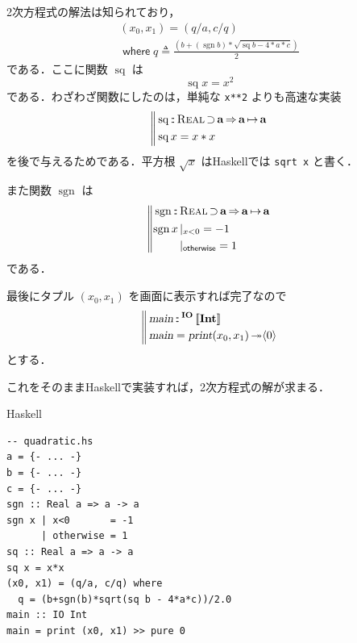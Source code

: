 \documentclass[a5paper,twoside,fleqn,draft]{jsbook}
\def\[{\left[\!\left[}
\def\]{\right]\!\right]}
\DeclareMathOperator{\sgn}{sgn}
\newcommand{\programminglanguage}[1]{\textsf{#1}}
\newcommand{\haskell}{\programminglanguage{Haskell}}
\newcommand{\code}[1]{\texttt{#1}}
\newenvironment{haskellcode}{\begin{itembox}[r]{\haskell}}{\end{itembox}}
\newcommand{\mBrace}{\Vert}
\newcommand{\mKeyword}[1]{\mathsf{#1}} %
\newcommand{\mOtherwiseKeyword}{\mKeyword{otherwise}}
\newcommand{\mWhereKeyword}{\mKeyword{where}}
\DeclareMathOperator{\mOtherwise}{\mOtherwiseKeyword}
\DeclareMathOperator{\mSuperClass}{\Rightarrow}
\DeclareMathOperator{\mSuperSet}{\supset}
\DeclareMathOperator{\mWhere}{\mWhereKeyword}
\newcommand{\mSpecialFunc}[1]{\mathrm{#1}}
\DeclareMathOperator{\mSq}{\mSpecialFunc{sq}}
\newcommand{\mAction}[1]{\textsl{#1}}
\DeclareMathOperator{\mMain}{\mAction{main}}
\DeclareMathOperator{\mPrint}{\mAction{print}}
\DeclareMathOperator{\mBindRightIgnore}{\twoheadrightarrow}
\DeclareMathOperator{\mIn}{{:\!:}}
\DeclareMathOperator{\mLetEq}{\triangleq}
\DeclareMathOperator{\mMapsTo}{\mapsto}
\newcommand{\mType}[1]{\mathbf{#1}}
\newcommand{\mIntType}{\mType{Int}}
\newcommand{\mGenericTypeAssemble}[2]{{}^{\mType{#1}}\[\mType{#2}\]}
\newcommand{\mIOType}[1]{\mGenericTypeAssemble{IO}{#1}}
\newcommand{\mIOIntType}{\mIOType{\mIntType}}
\newcommand{\mPureWith}[1]{\langle#1\rangle}
\newcommand{\mGenericTypeClass}[1]{\textsc{#1}} %
\newcommand{\mRealTypeClass}{\mGenericTypeClass{Real}}
\newcommand{\mGuard}[1]{\mathop{\mid_{#1}}}
\newcommand{\mProj}[2]{#1\mMapsTo#2}
\begin{document}
2次方程式の解法は知られており，
\begin{multline}
  (x_0,x_1)=(q/a,c/q)\\
  \mWhere q\mLetEq\frac{\left(b+(\sgn b)*\sqrt{\mSq b-4*a*c}\right)}{2}
\end{multline}
である．ここに関数 $\mSq$ は
\begin{equation}
  \mSq x=x^2
\end{equation}
である．わざわざ関数にしたのは，単純な \code{x**2} よりも高速な実装
\begin{equation}
  \left\mBrace
  \begin{aligned}
    &\mSq\mIn\mRealTypeClass\mSuperSet\mType{a}
    \mSuperClass\mProj{\mType{a}}{\mType{a}}\\
    &\mSq x=x*x
  \end{aligned}
  \right.
\end{equation}
を後で与えるためである．平方根 $\sqrt{x}$ は\haskell では \code{sqrt
  x} と書く．

また関数 $\sgn$ は
\begin{equation}
  \left\mBrace
  \begin{aligned}
    {}&\sgn\mIn{}\mRealTypeClass\mSuperSet\mType{a}
    \mSuperClass\mProj{\mType{a}}{\mType{a}}\\
    {}&
    \begin{aligned}
      \sgn x&\mGuard{x<0}=-1\\
      &\mGuard{\mOtherwise}=1
    \end{aligned}
  \end{aligned}
  \right.
\end{equation}
である．

最後にタプル $(x_0,x_1)$ を画面に表示すれば完了なので
\begin{equation}
  \left\mBrace
  \begin{aligned}
    {}&\mMain\mIn\mIOIntType\\
    {}&\mMain=\mPrint(x_0,x_1)\mBindRightIgnore\mPureWith{0}
  \end{aligned}
  \right.
\end{equation}
とする．

これをそのまま\haskell で実装すれば，2次方程式の解が求まる．
\begin{haskellcode}
\begin{verbatim}
-- quadratic.hs
a = {- ... -}
b = {- ... -}
c = {- ... -}
sgn :: Real a => a -> a
sgn x | x<0       = -1
      | otherwise = 1
sq :: Real a => a -> a
sq x = x*x
(x0, x1) = (q/a, c/q) where
  q = (b+sgn(b)*sqrt(sq b - 4*a*c))/2.0
main :: IO Int
main = print (x0, x1) >> pure 0
\end{verbatim}
\end{haskellcode}
\end{document}
